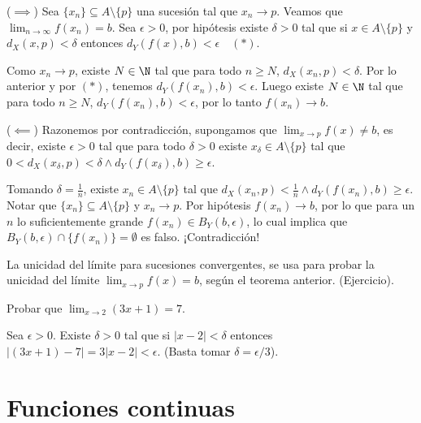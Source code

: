 \begin{dem} %
($\implies$) Sea $\{x_n\} \subseteq A \setminus \{p\}$ una sucesión tal que $x_n \to p$. %
Veamos que $\lim_{n \to \infty} f(x_n) = b$. %
Sea $\epsilon > 0$, por hipótesis existe $\delta > 0$ tal que si $x \in A \setminus \{p\}$ y $d_X(x, p) < \delta$ entonces $d_Y(f(x), b) < \epsilon \quad (*)$. %

Como $x_n \to p$, existe $N \in \N$ tal que para todo $n \ge N$, $d_X(x_n, p) < \delta$. %
Por lo anterior y por $(*)$, tenemos $d_Y(f(x_n), b) < \epsilon$. %
Luego existe $N \in \N$ tal que para todo $n \ge N$, $d_Y(f(x_n), b) < \epsilon$, por lo tanto $f(x_n) \to b$. %

($\impliedby$) Razonemos por contradicción, supongamos que $\lim_{x \to p} f(x) \neq b$, %
es decir, existe $\epsilon > 0$ tal que para todo $\delta > 0$ existe $x_\delta \in A \setminus \{p\}$ %
tal que $0 < d_X(x_\delta, p) < \delta \land d_Y(f(x_\delta), b) \ge \epsilon$. %

Tomando $\delta = \frac{1}{n}$, existe $x_n \in A \setminus \{p\}$ tal que $d_X(x_n, p) < \frac{1}{n} \land d_Y(f(x_n), b) \ge \epsilon$. %
Notar que $\{x_n\} \subseteq A \setminus \{p\}$ y $x_n \to p$. %
Por hipótesis $f(x_n) \to b$, por lo que para un $n$ lo suficientemente grande $f(x_n) \in B_Y(b, \epsilon)$, lo cual implica que $B_Y(b, \epsilon) \cap \{f(x_n)\} = \emptyset$ es falso. ¡Contradicción! %
\end{dem}

\begin{remark}
La unicidad del límite para sucesiones convergentes, se usa para probar la unicidad del límite $\lim_{x \to p} f(x) = b$, según el teorema anterior. (Ejercicio). %
\end{remark}

\begin{example}
Probar que $\lim_{x \to 2} (3x + 1) = 7$. %

Sea $\epsilon > 0$. Existe $\delta > 0$ tal que si $|x - 2| < \delta$ entonces $|(3x + 1) - 7| = 3|x - 2| < \epsilon$. %
(Basta tomar $\delta = \epsilon/3$).
\end{example}

\section*{Funciones continuas} %

